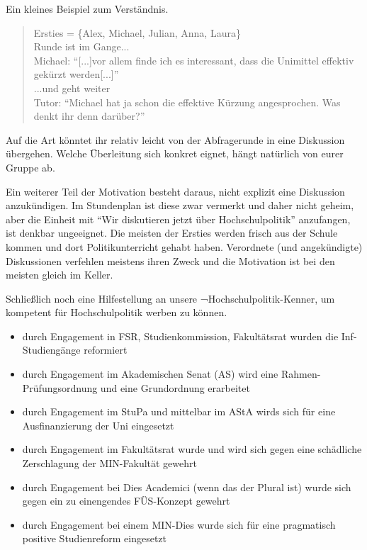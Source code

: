 \documentclass[a4paper,11pt]{scrartcl} %
\begin{document}
Ein kleines Beispiel zum Verständnis.

\begin{quotation}
  Ersties = \{Alex, Michael, Julian, Anna, Laura\}\\
  Runde ist im Gange...\\
  Michael: "`[...]vor allem finde ich es interessant, dass die Unimittel effektiv gekürzt werden[...]"'\\
  ...und geht weiter\\
  Tutor: "`Michael hat ja schon die effektive Kürzung angesprochen. Was denkt ihr denn darüber?"'
\end{quotation}

Auf die Art könntet ihr relativ leicht von der Abfragerunde in eine Diskussion übergehen. Welche
Überleitung sich konkret eignet, hängt natürlich von eurer Gruppe ab.

Ein weiterer Teil der Motivation besteht daraus, nicht explizit eine Diskussion anzukündigen.
Im Stundenplan ist diese zwar vermerkt und daher nicht geheim, aber die Einheit mit
"`Wir diskutieren jetzt über Hochschulpolitik"' anzufangen, ist denkbar ungeeignet. Die meisten
der Ersties werden frisch aus der Schule kommen und dort Politikunterricht gehabt haben. Verordnete
(und angekündigte) Diskussionen verfehlen meistens ihren Zweck und die Motivation ist bei den meisten
gleich im Keller.

Schließlich noch eine Hilfestellung an unsere ¬Hochschulpolitik-Kenner, um kompetent für Hochschulpolitik
werben zu können.

\begin{itemize}
  \item durch Engagement in FSR, Studienkommission, Fakultätsrat wurden die Inf-Studiengänge reformiert
  \item durch Engagement im Akademischen Senat (AS) wird eine Rahmen-Prüfungsordnung und eine Grundordnung erarbeitet
  \item durch Engagement im StuPa und mittelbar im AStA wirds sich für eine Ausfinanzierung der Uni eingesetzt
  \item durch Engagement im Fakultätsrat wurde und wird sich gegen eine schädliche Zerschlagung der MIN-Fakultät gewehrt
  \item durch Engagement bei Dies Academici (wenn das der Plural ist) wurde sich gegen ein zu einengendes FÜS-Konzept gewehrt
  \item durch Engagement bei einem MIN-Dies wurde sich für eine pragmatisch positive Studienreform eingesetzt
\end{itemize}
\end{document}
